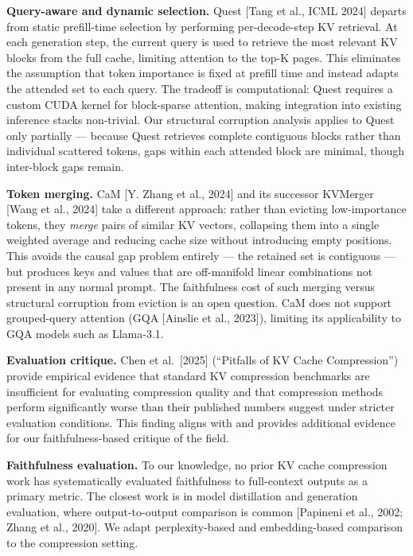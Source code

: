 \documentclass[10pt,letterpaper]{article}
\begin{document}
\textbf{Query-aware and dynamic selection.} Quest {[}Tang et al., ICML
2024{]} departs from static prefill-time selection by performing
per-decode-step KV retrieval. At each generation step, the current query
is used to retrieve the most relevant KV blocks from the full cache,
limiting attention to the top-K pages. This eliminates the assumption
that token importance is fixed at prefill time and instead adapts the
attended set to each query. The tradeoff is computational: Quest
requires a custom CUDA kernel for block-sparse attention, making
integration into existing inference stacks non-trivial. Our structural
corruption analysis applies to Quest only partially --- because Quest
retrieves complete contiguous blocks rather than individual scattered
tokens, gaps within each attended block are minimal, though inter-block
gaps remain.


\textbf{Token merging.} CaM {[}Y. Zhang et al., 2024{]} and its
successor KVMerger {[}Wang et al., 2024{]} take a different approach:
rather than evicting low-importance tokens, they \emph{merge} pairs of
similar KV vectors, collapsing them into a single weighted average and
reducing cache size without introducing empty positions. This avoids the
causal gap problem entirely --- the retained set is contiguous --- but
produces keys and values that are off-manifold linear combinations not
present in any normal prompt. The faithfulness cost of such merging
versus structural corruption from eviction is an open question. CaM does
not support grouped-query attention (GQA {[}Ainslie et al., 2023{]}), limiting its applicability to
GQA models such as Llama-3.1.

\textbf{Evaluation critique.} Chen et al.~{[}2025{]} (``Pitfalls of KV
Cache Compression'') provide empirical evidence that standard KV
compression benchmarks are insufficient for evaluating compression
quality and that compression methods perform significantly worse than
their published numbers suggest under stricter evaluation conditions.
This finding aligns with and provides additional evidence for our
faithfulness-based critique of the field.

\textbf{Faithfulness evaluation.} To our knowledge, no prior KV cache
compression work has systematically evaluated faithfulness to
full-context outputs as a primary metric. The closest work is in model
distillation and generation evaluation, where output-to-output
comparison is common {[}Papineni et al., 2002; Zhang et al., 2020{]}. We
adapt perplexity-based and embedding-based comparison to the compression
setting.
\end{document}
